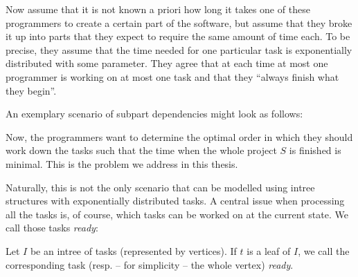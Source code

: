 Now assume that it is not known a priori how long it takes one of these programmers to create a certain part of the software, but assume that they broke it up into parts that they expect to require the same amount of time each. To be precise, they assume that the time needed for one particular task is exponentially distributed with some parameter. They agree that at each time at most one programmer is working on at most one task and that they ``always finish what they begin''.

An exemplary scenario of subpart dependencies might look as follows:

\begin{center}
\end{center}

Now, the programmers want to determine the optimal order in which they should work down the tasks such that the time when the whole project $S$ is finished is minimal. This is the problem we address in this thesis.

Naturally, this is not the only scenario that can be modelled using intree structures with exponentially distributed tasks. A central issue when processing all the tasks is, of course, which tasks can be worked on at the current state. We call those tasks \emph{ready}:

\begin{definition}
  Let $I$ be an intree of tasks (represented by vertices). If $t$ is a leaf of $I$, we call the corresponding task (resp. -- for simplicity -- the whole vertex) \emph{ready}.
\end{definition}

